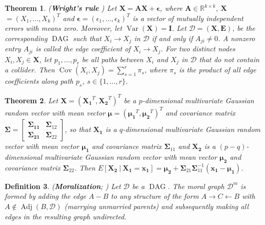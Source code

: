 \documentclass[11pt,a4paper]{article}
\newtheorem{definition}{Definition}
\newtheorem{theorem}[definition]{Theorem}
\newcommand\given[1][]{\:#1\vert\:}
\DeclareMathOperator{\Cov}{Cov}
\DeclareMathOperator{\Var}{Var}
\DeclareMathOperator{\DAG}{DAG}
\DeclareMathOperator{\Adj}{Adj}
\newcommand{\g}[1][G]{\mathcal{#1}}
\begin{document}
\begin{theorem} (\textbf{Wright's rule} \citealp[cf.][]{wright1921correlation}) Let $\mathbf{X} = \mathbf{A}\mathbf{X} + \mathbf{\epsilon}$, where $\mathbf{A} \in \mathbb{R}^{k \times  k}$, $\mathbf{X}$ $= (X_1,\dots, X_k)^T$  and $\mathbf{\epsilon} = (\epsilon_1,\dots, \epsilon_k)^T$ is a vector of mutually independent errors with means zero. Moreover, let $\Var(\mathbf{X}) = \mathbf{I}$.
Let $\g[D] = (\mathbf{X},\mathbf{E})$, be the corresponding $\DAG$ such that $X_i \rightarrow X_j$ in $\g[D]$ if and only if $A_{ji} \neq 0$. A nonzero entry $A_{ji}$ is called the edge coefficient of $X_i \rightarrow X_j$.
For two distinct nodes $X_i,X_j \in \mathbf{X}$, let $p_1, \dots, p_r$ be all paths between $X_i$ and $X_j$ in $\g[D]$ that do not contain a collider. Then $\Cov(X_i,X_j) = \sum_{s=1}^{r}\pi_s$, where $\pi_s$ is the product of all edge coefficients along path $p_s$, $s \in \{1,\dots, r\}$.
\label{theorem:wright}
\end{theorem}
\begin{theorem} \citep[cf.\ Theorem 3.2.4][p63]{mardia1980multivariate}
Let $\mathbf{X} = (\mathbf{X_1}^T,\mathbf{X_2}^T)^T$ be a $p$-dimensional multivariate Gaussian random vector with mean vector $\mathbf{\mu} = (\mathbf{\mu_1}^T,\mathbf{\mu_2}^T)^T$ and covariance matrix $\mathbf{\Sigma} = \begin{bmatrix}
\mathbf{\Sigma_{11}} & \mathbf{\Sigma}_{12} \\
\mathbf{\Sigma_{21}} & \mathbf{\Sigma}_{22}
\end{bmatrix}$, so that $\mathbf{X_1}$ is a $q$-dimensional multivariate Gaussian random vector with mean vector $\mathbf{\mu_1}$ and covariance matrix $\mathbf{\Sigma}_{11}$ and  $\mathbf{X_2}$ is a $(p-q)$-dimensional multivariate Gaussian random vector with mean vector $\mathbf{\mu_2}$ and covariance matrix $\mathbf{\Sigma}_{22}$.
Then $E[\mathbf{X_2} \given \mathbf{X_1 = x_1}] = \mathbf{\mu_2} + \mathbf{\Sigma}_{21}\mathbf{\Sigma}_{11}^{-1} (\mathbf{x_1} - \mathbf{\mu_1})$.
\label{theorem:mardia-condexp}
\end{theorem}

\begin{definition}{(\textbf{Moralization}; \citealp{lauritzen1988local})} 
Let $\g[D]$ be a $\DAG$. The \textit{moral} graph $\g[D]^m$ is formed by adding the edge $A-B$ to any structure of the form $A \rightarrow C \leftarrow B$ with $A \notin \Adj(B,\g[D])$ (marrying unmarried parents) and subsequently making all edges in the resulting graph undirected.
\label{def:moralization}
\end{definition}
\end{document}
